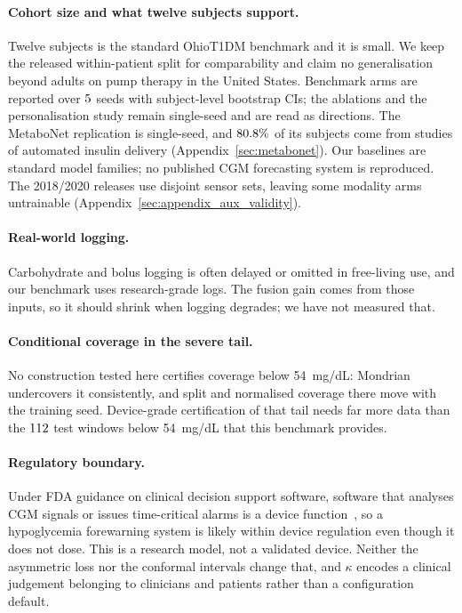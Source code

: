 \documentclass[pmlr,twocolumn,10pt]{jmlr}
\begin{document}
\paragraph{Cohort size and what twelve subjects support.} Twelve subjects is the
standard OhioT1DM benchmark and it is small. We keep the released within-patient
split for comparability and claim no generalisation beyond adults on pump
therapy in the United States. Benchmark arms are reported over
$5$ seeds with subject-level bootstrap CIs; the ablations and the
personalisation study remain single-seed and are read as directions. The
MetaboNet replication is single-seed, and $80.8\%$ of its
subjects come from studies of automated insulin delivery
(Appendix~\ref{sec:metabonet}).
Our baselines are standard model families; no published CGM forecasting system
is reproduced. The 2018/2020
releases use disjoint sensor sets, leaving some modality arms untrainable
(Appendix~\ref{sec:appendix_aux_validity}).

\paragraph{Real-world logging.} Carbohydrate and bolus logging is often delayed
or omitted in free-living use, and our benchmark uses research-grade logs. The
fusion gain comes from those inputs, so it should shrink when logging degrades;
we have not measured that.

\paragraph{Conditional coverage in the severe tail.} No construction tested here
certifies coverage below 54~mg/dL: Mondrian undercovers it consistently, and
split and normalised coverage there move with the training seed. Device-grade
certification of that tail needs far more data than the $112$ test
windows below 54~mg/dL that this benchmark provides.

\paragraph{Regulatory boundary.} Under FDA guidance on clinical decision
support software, software that analyses CGM signals or issues time-critical
alarms is a device function~\citep{fda2026cds}, so a hypoglycemia forewarning
system is likely within device regulation even though it does not dose. This is
a research model, not a validated device. Neither the asymmetric loss nor the
conformal intervals change that, and $\kappa$ encodes a clinical judgement
belonging to clinicians and patients rather than a configuration default.
\end{document}
